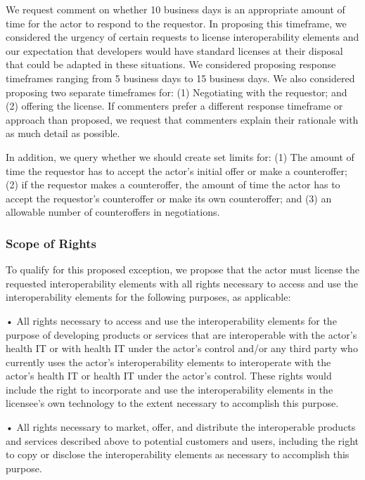 \documentclass[twoside,11pt]{article}
\begin{document}
          We request comment on whether 10 business days is an appropriate amount of time for the actor to respond to the requestor. In proposing this timeframe, we considered the urgency of certain requests to license interoperability elements and our expectation that developers would have standard licenses at their disposal that could be adapted in these situations. We considered proposing response timeframes ranging from 5 business days to 15 business days. We also considered proposing two separate timeframes for: (1) Negotiating with the requestor; and (2) offering the license. If commenters prefer a different response timeframe or approach than proposed, we request that commenters explain their rationale with as much detail as possible.


          In addition, we query whether we should create set limits for: (1) The amount of time the requestor has to accept the actor's initial offer or make a counteroffer; (2) if the requestor makes a counteroffer, the amount of time the actor has to accept the requestor's counteroffer or make its own counteroffer; and (3) an allowable number of counteroffers in negotiations.


          \subsubsection{Scope of Rights}

          To qualify for this proposed exception, we propose that the actor must license the requested interoperability elements with all rights necessary to access and use the interoperability elements for the following purposes, as applicable:


          • All rights necessary to access and use the interoperability elements for the purpose of developing products or services that are interoperable with the actor's health IT or with health IT under the actor's control and/or any third party who currently uses the actor's interoperability elements to interoperate with the actor's health IT or health IT under the actor's control. These rights would include the right to incorporate and use the interoperability elements in the licensee's own technology to the extent necessary to accomplish this purpose.


          • All rights necessary to market, offer, and distribute the interoperable products and services described above to potential customers and users, including the right to copy or disclose the interoperability elements as necessary to accomplish this purpose.
\end{document}
